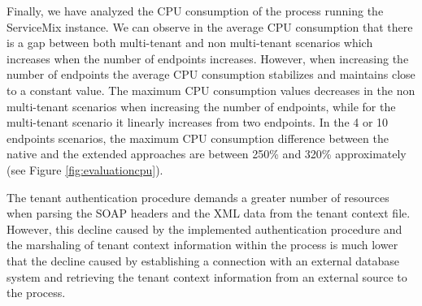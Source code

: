 	Finally, we have analyzed the CPU consumption of the process running the ServiceMix instance. We can observe in the average CPU consumption that there is a gap between both multi-tenant and non multi-tenant scenarios which increases when the number of endpoints increases. However, when increasing the number of endpoints the average CPU consumption stabilizes and maintains close to a constant value. The maximum CPU consumption values decreases in the non multi-tenant scenarios when increasing the number of endpoints, while for the multi-tenant scenario it linearly increases from two endpoints. In the 4 or 10 endpoints scenarios, the maximum CPU consumption difference between the native and the extended approaches are between 250\% and 320\% approximately (see Figure \ref{fig:evaluationcpu}).

The tenant authentication procedure demands a greater number of resources when parsing the \ac{SOAP} headers and the \ac{XML} data from the tenant context file. However, this decline caused by the implemented authentication procedure and the marshaling of tenant context information within the process is much lower that the decline caused by establishing a connection with an external database system and retrieving the tenant context information from an external source to the process.  
	
	


